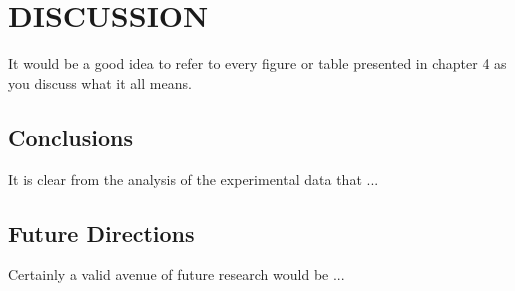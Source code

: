 
\chapter{DISCUSSION\label{ch:conclusions}}

It would be a good idea to refer to every figure or table presented in chapter 4 as you discuss what it all means.

\section{Conclusions} \label{sec:conclusions}

It is clear from the analysis of the experimental data that ...

\section{Future Directions}

Certainly a valid avenue of future research would be ...